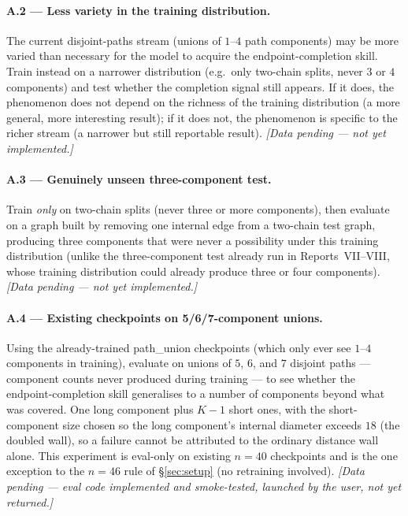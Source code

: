 \documentclass[11pt,a4paper]{article}
\begin{document}
\paragraph{A.2 --- Less variety in the training distribution.} The current disjoint-paths
stream (unions of $1$--$4$ path components) may be more varied than necessary for the model to
acquire the endpoint-completion skill. Train instead on a narrower distribution (e.g.\ only
two-chain splits, never $3$ or $4$ components) and test whether the completion signal still
appears. If it does, the phenomenon does not depend on the richness of the training
distribution (a more general, more interesting result); if it does not, the phenomenon is
specific to the richer stream (a narrower but still reportable result).
\emph{[Data pending --- not yet implemented.]}

\paragraph{A.3 --- Genuinely unseen three-component test.} Train \emph{only} on two-chain
splits (never three or more components), then evaluate on a graph built by removing one
internal edge from a two-chain test graph, producing three components that were never a
possibility under this training distribution (unlike the three-component test already run in
Reports~VII--VIII, whose training distribution could already produce three or four components).
\emph{[Data pending --- not yet implemented.]}

\paragraph{A.4 --- Existing checkpoints on 5/6/7-component unions.} Using the already-trained
path\_union checkpoints (which only ever see $1$--$4$ components in training), evaluate on
unions of $5$, $6$, and $7$ disjoint paths --- component counts never produced during training
--- to see whether the endpoint-completion skill generalises to a number of components beyond
what was covered. One long component plus $K{-}1$ short ones, with the short-component size
chosen so the long component's internal diameter exceeds $18$ (the doubled wall), so a failure
cannot be attributed to the ordinary distance wall alone. This experiment is eval-only on
existing $n{=}40$ checkpoints and is the one exception to the $n{=}46$ rule of
\S\ref{sec:setup} (no retraining involved). \emph{[Data pending --- eval code implemented and
smoke-tested, launched by the user, not yet returned.]}
\end{document}
